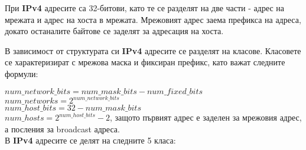 \documentclass[fleqn,12pt]{article}
\begin{document}
\begin{flushleft}
При \textbf{IPv4} адресите са 32-битови, като те се разделят на две части - адрес на мрежата и адрес на хоста в мрежата.
Мрежовият адрес заема префикса на адреса, докато останалите байтове се заделят за адресация на хоста.

В зависимост от структурата си \textbf{IPv4} адресите се разделят на класове. Класовете се характеризират с мрежова маска и фиксиран префикс, като важат следните формули:

$num\_network\_bits = num\_mask\_bits - num\_fixed\_bits$ \\
$num\_networks = 2^{num\_network\_bits}$ \\
$num\_host\_bits = 32 - num\_mask\_bits$ \\
$num\_hosts = 2^{num\_host\_bits} - 2$, защото първият адрес е заделен за мрежовия адрес, а посления за broadcast адреса. \\

В \textbf{IPv4} адресите се делят на следните 5 класа:


\end{flushleft}
\end{document}
